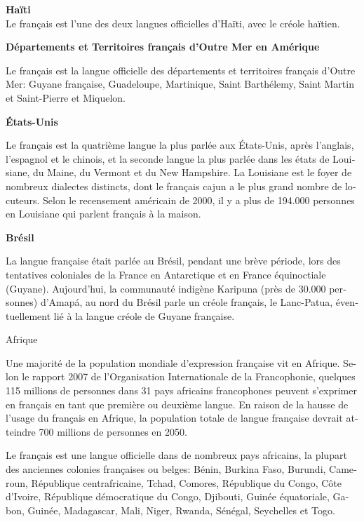 \begin{french}
\begin{multicols}{2}
{\bf Haïti}\\
Le français est l'une des deux langues officielles d'Haïti, avec le créole haïtien.

{\bf Départements et Territoires français d'Outre Mer en Amérique}

Le français est la langue officielle des départements et territoires
français d'Outre Mer: Guyane française, Guadeloupe,
Martinique, Saint Barthélemy, Saint Martin et Saint-Pierre et
Miquelon.

{\bf États-Unis}

Le français est la quatrième langue la plus parlée aux États-Unis,
après l'anglais, l'espagnol et le chinois, et la
seconde langue la plus parlée dans les états de Louisiane, du Maine,
du Vermont et du New Hampshire. La Louisiane est le foyer de nombreux
dialectes distincts, dont le français cajun a le plus grand nombre de
locuteurs. Selon le recensement américain de 2000, il y a plus de
194.000 personnes en Louisiane qui parlent français à la maison.

{\bf Brésil}

La langue française était parlée au Brésil, pendant une brève période,
lors des tentatives coloniales de la France en Antarctique et en
France équinoctiale (Guyane). Aujourd'hui, la communauté indigène
Karipuna (près de 30.000 personnes) d'Amapá, au nord du Brésil
parle un créole français, le Lanc-Patua, éventuellement lié à la
langue créole de Guyane française.

\vspace{1cm}
\begin{center}
{\sc Afrique}
\end{center}

Une majorité de la population mondiale d'expression française
vit en Afrique. Selon le rapport 2007 de l'Organisation
Internationale de la Francophonie, quelques 115 millions de personnes
dans 31 pays africains francophones peuvent s'exprimer en
français en tant que première ou deuxième langue. En raison de la
hausse de l'usage du français en Afrique, la population totale de langue
française devrait atteindre 700 millions de personnes en 2050.

Le français est une langue officielle dans de nombreux pays africains,
la plupart des anciennes colonies françaises ou belges: Bénin, Burkina
Faso, Burundi, Cameroun, République centrafricaine, Tchad, Comores,
République du Congo, Côte d'Ivoire, République démocratique du
Congo, Djibouti, Guinée équatoriale, Gabon, Guinée, Madagascar, Mali,
Niger, Rwanda, Sénégal, Seychelles et Togo.


\end{multicols}
\end{french}

